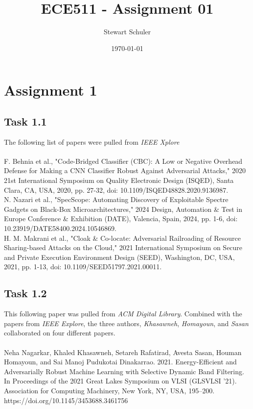 \documentclass{article}
\title{ECE511 - Assignment 01}
\author{Stewart Schuler}
\date{\today}
\begin{document}
	\maketitle

	\section{Assignment 1} 
	\subsection*{Task 1.1}
	The following list of papers were pulled from \textit{IEEE Xplore}\\
	\\
	\noindent [1] F. Behnia et al., "Code-Bridged Classifier (CBC): A Low or Negative Overhead Defense for Making a CNN Classifier Robust Against Adversarial Attacks," 2020 21st International Symposium on Quality Electronic Design (ISQED), Santa Clara, CA, USA, 2020, pp. 27-32, doi: 10.1109/ISQED48828.2020.9136987. \\
	
	\noindent [2] N. Nazari et al., "SpecScope: Automating Discovery of Exploitable Spectre Gadgets on Black-Box Microarchitectures," 2024 Design, Automation \& Test in Europe Conference \& Exhibition (DATE), Valencia, Spain, 2024, pp. 1-6, doi: 10.23919/DATE58400.2024.10546869. \\
	
	\noindent [3] H. M. Makrani et al., "Cloak \& Co-locate: Adversarial Railroading of Resource Sharing-based Attacks on the Cloud," 2021 International Symposium on Secure and Private Execution Environment Design (SEED), Washington, DC, USA, 2021, pp. 1-13, doi: 10.1109/SEED51797.2021.00011.\\
	
	\subsection*{Task 1.2}
	This following paper was pulled from \textit{ACM Digital Library}. Combined with the papers from \textit{IEEE Explore}, the three authors, \textit{Khasawneh}, \textit{Homayoun}, and \textit{Sasan} collaborated on four different papers.\\
	\\
	\noindent [4] Neha Nagarkar, Khaled Khasawneh, Setareh Rafatirad, Avesta Sasan, Houman Homayoun, and Sai Manoj Pudukotai Dinakarrao. 2021. Energy-Efficient and Adversarially Robust Machine Learning with Selective Dynamic Band Filtering. In Proceedings of the 2021 Great Lakes Symposium on VLSI (GLSVLSI '21). Association for Computing Machinery, New York, NY, USA, 195–200. https://doi.org/10.1145/3453688.3461756\\
	
\end{document}
